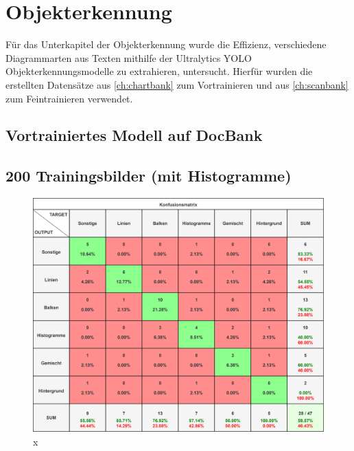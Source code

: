 \section{Objekterkennung}

Für das Unterkapitel der Objekterkennung wurde die Effizienz, verschiedene Diagrammarten aus Texten mithilfe der Ultralytics YOLO Objekterkennungsmodelle zu extrahieren, untersucht. Hierfür wurden die erstellten Datensätze aus \ref{ch:chartbank} zum Vortrainieren und aus \ref{ch:scanbank} zum Feintrainieren verwendet.

\subsection{Vortrainiertes Modell auf DocBank}
\subsection*{200 Trainingsbilder (mit Histogramme)}
\begin{figure}[H]
    \centering
    \captionsetup{width=1\linewidth}
    \includegraphics[width=1\textwidth]{Experimente/img/detect/1_val@0.404_200_histo/konfusionsmatrix.png}
    \caption{ x}
    \label{fig:extraction_output}
\end{figure}

